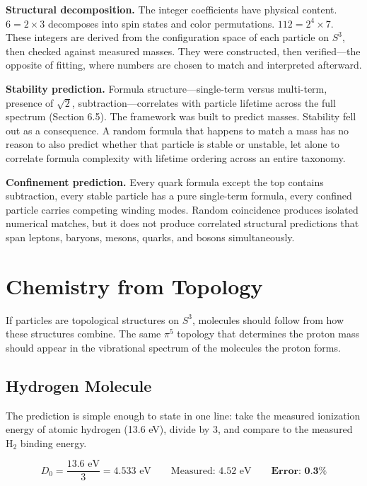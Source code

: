 \documentclass[12pt]{article}
\begin{document}
\textbf{Structural decomposition.} The integer coefficients have physical content. $6 = 2 \times 3$ decomposes into spin states and color permutations. $112 = 2^4 \times 7$. These integers are derived from the configuration space of each particle on $S^3$, then checked against measured masses. They were constructed, then verified---the opposite of fitting, where numbers are chosen to match and interpreted afterward.

\textbf{Stability prediction.} Formula structure---single-term versus multi-term, presence of $\sqrt{2}$, subtraction---correlates with particle lifetime across the full spectrum (Section 6.5). The framework was built to predict masses. Stability fell out as a consequence. A random formula that happens to match a mass has no reason to also predict whether that particle is stable or unstable, let alone to correlate formula complexity with lifetime ordering across an entire taxonomy.

\textbf{Confinement prediction.} Every quark formula except the top contains subtraction, every stable particle has a pure single-term formula, every confined particle carries competing winding modes. Random coincidence produces isolated numerical matches, but it does not produce correlated structural predictions that span leptons, baryons, mesons, quarks, and bosons simultaneously.

\section{Chemistry from Topology}

If particles are topological structures on $S^3$, molecules should follow from how these structures combine. The same $\pi^5$ topology that determines the proton mass should appear in the vibrational spectrum of the molecules the proton forms.

\subsection{Hydrogen Molecule}

The prediction is simple enough to state in one line: take the measured ionization energy of atomic hydrogen (13.6 eV), divide by 3, and compare to the measured H$_2$ binding energy.

$$D_0 = \frac{13.6 \text{ eV}}{3} = 4.533 \text{ eV} \qquad \text{Measured: } 4.52 \text{ eV} \qquad \textbf{Error: 0.3\%}$$
\end{document}
